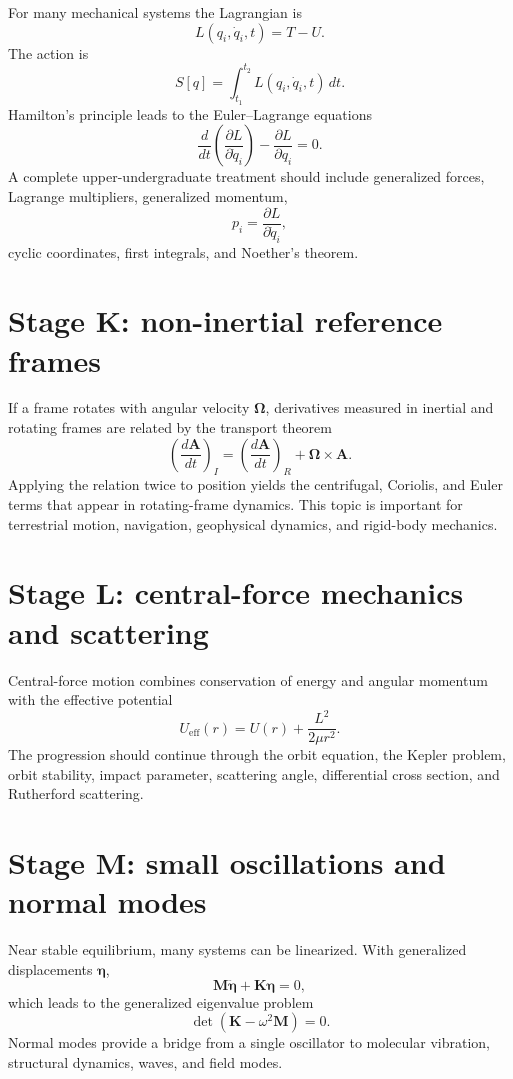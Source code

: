 For many mechanical systems the Lagrangian is
\[
L(q_i,\dot q_i,t)=T-U.
\]
The action is
\[
S[q]=\int_{t_1}^{t_2}L(q_i,\dot q_i,t)\,dt.
\]
Hamilton's principle leads to the Euler--Lagrange equations
\[
\frac{d}{dt}\left(\frac{\partial L}{\partial \dot q_i}\right)
-\frac{\partial L}{\partial q_i}=0.
\]
A complete upper-undergraduate treatment should include generalized forces, Lagrange multipliers,
generalized momentum,
\[
p_i=\frac{\partial L}{\partial\dot q_i},
\]
cyclic coordinates, first integrals, and Noether's theorem.

\section{Stage K: non-inertial reference frames}

If a frame rotates with angular velocity $\boldsymbol\Omega$, derivatives measured in inertial and
rotating frames are related by the transport theorem
\[
\left(\frac{d\mathbf A}{dt}\right)_I
=
\left(\frac{d\mathbf A}{dt}\right)_R
+\boldsymbol\Omega\times\mathbf A.
\]
Applying the relation twice to position yields the centrifugal, Coriolis, and Euler terms that
appear in rotating-frame dynamics.  This topic is important for terrestrial motion, navigation,
geophysical dynamics, and rigid-body mechanics.

\section{Stage L: central-force mechanics and scattering}

Central-force motion combines conservation of energy and angular momentum with the effective
potential
\[
U_{\mathrm{eff}}(r)=U(r)+\frac{L^2}{2\mu r^2}.
\]
The progression should continue through the orbit equation, the Kepler problem, orbit stability,
impact parameter, scattering angle, differential cross section, and Rutherford scattering.

\section{Stage M: small oscillations and normal modes}

Near stable equilibrium, many systems can be linearized.  With generalized displacements
$\boldsymbol\eta$,
\[
\mathbf M\ddot{\boldsymbol\eta}+\mathbf K\boldsymbol\eta=0,
\]
which leads to the generalized eigenvalue problem
\[
\det(\mathbf K-\omega^2\mathbf M)=0.
\]
Normal modes provide a bridge from a single oscillator to molecular vibration, structural dynamics,
waves, and field modes.

